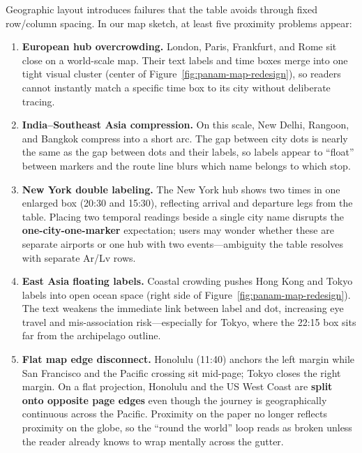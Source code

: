 \documentclass[11pt]{article}
\begin{document}
Geographic layout introduces failures that the table avoids through fixed row/column spacing. In our map sketch, at least five proximity problems appear:

\begin{enumerate}[leftmargin=*]
  \item \textbf{European hub overcrowding.}
  London, Paris, Frankfurt, and Rome sit close on a world-scale map. Their text labels and time boxes merge into one tight visual cluster (center of Figure~\ref{fig:panam-map-redesign}), so readers cannot instantly match a specific time box to its city without deliberate tracing.

  \item \textbf{India--Southeast Asia compression.}
  On this scale, New Delhi, Rangoon, and Bangkok compress into a short arc. The gap between city dots is nearly the same as the gap between dots and their labels, so labels appear to ``float'' between markers and the route line blurs which name belongs to which stop.

  \item \textbf{New York double labeling.}
  The New York hub shows two times in one enlarged box (20:30 and 15:30), reflecting arrival and departure legs from the table. Placing two temporal readings beside a single city name disrupts the \textbf{one-city-one-marker} expectation; users may wonder whether these are separate airports or one hub with two events---ambiguity the table resolves with separate Ar/Lv rows.

  \item \textbf{East Asia floating labels.}
  Coastal crowding pushes Hong Kong and Tokyo labels into open ocean space (right side of Figure~\ref{fig:panam-map-redesign}). The text weakens the immediate link between label and dot, increasing eye travel and mis-association risk---especially for Tokyo, where the 22:15 box sits far from the archipelago outline.

  \item \textbf{Flat map edge disconnect.}
  Honolulu (11:40) anchors the left margin while San Francisco and the Pacific crossing sit mid-page; Tokyo closes the right margin. On a flat projection, Honolulu and the US West Coast are \textbf{split onto opposite page edges} even though the journey is geographically continuous across the Pacific. Proximity on the paper no longer reflects proximity on the globe, so the ``round the world'' loop reads as broken unless the reader already knows to wrap mentally across the gutter.
\end{enumerate}
\end{document}
